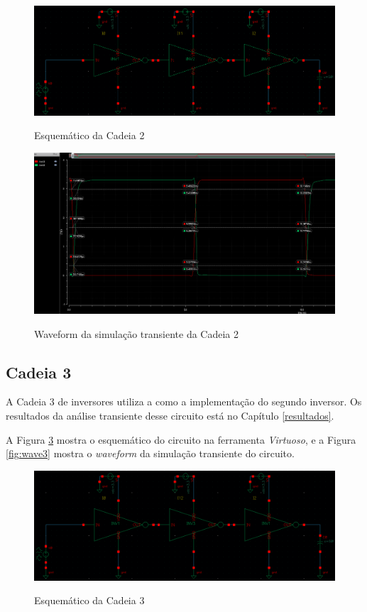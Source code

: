 \documentclass{iiufrgs}
\newcommand{\virtuoso}{\textit{Virtuoso}}
\begin{document}
\begin{figure}[htbp]
    \centering
    \caption{Esquemático da Cadeia 2}
    \includegraphics[scale=0.33]{images/circ2.png}
    \label{fig:circ_e2}
\end{figure}

\begin{figure}[htbp]
    \centering
    \caption{Waveform da simulação transiente da Cadeia 2}
    \includegraphics[scale=0.4]{images/wave_ex2.png}
    \label{fig:wave2}
\end{figure}

\FloatBarrier

\subsection{Cadeia 3}
A Cadeia 3 de inversores utiliza a  como a implementação do segundo inversor. Os resultados da análise transiente desse circuito está no Capítulo \ref{resultados}.\

A Figura \ref{fig:circ_e3} mostra o esquemático do circuito na ferramenta \virtuoso, e a Figura \ref{fig:wave3} mostra o \textit{waveform} da simulação transiente do circuito.\

\begin{figure}[htbp]
    \centering
    \caption{Esquemático da Cadeia 3}
    \includegraphics[scale=0.33]{images/circ3.png}
    \label{fig:circ_e3}
\end{figure}
\end{document}
